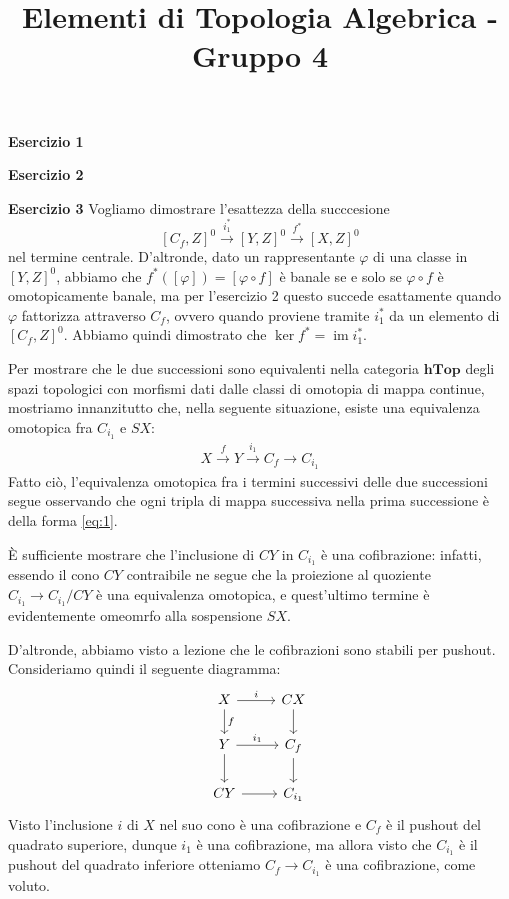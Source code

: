 \documentclass[a4paper]{article}
\title{Elementi di Topologia Algebrica - Gruppo 4\vspace{-1cm}}
\author{}
\newcommand{\im}{\operatorname{im}}
\theoremstyle{definition}
\theoremstyle{definition}
\theoremstyle{remark}
\theoremstyle{definition}
\begin{document}
\maketitle

\textbf{Esercizio 1}

\textbf{Esercizio 2}

\textbf{Esercizio 3}
Vogliamo dimostrare l'esattezza della succcesione
\[
    [C_f, Z]^0 \overset{i_1^*}{\to} [Y, Z]^0 \overset{f^*}{\to} [X, Z]^0
\]
nel termine centrale. D'altronde, dato un rappresentante $\varphi$ di una classe in $[Y, Z]^0$, abbiamo che $f^*([\varphi]) = [\varphi\circ f]$ è banale se e solo se $\varphi \circ f$ è omotopicamente banale, ma per l'esercizio 2 questo succede
esattamente quando $\varphi$ fattorizza attraverso $C_f$, ovvero quando proviene tramite $i_1^*$ da un elemento di $[C_f, Z]^0$. Abbiamo quindi dimostrato che $\ker f^* = \im i_1^*$.

Per mostrare che le due successioni sono equivalenti nella categoria $\mathbf{hTop}$ degli spazi topologici con morfismi dati dalle classi di omotopia di mappa continue, mostriamo innanzitutto che, nella seguente situazione, esiste una equivalenza omotopica fra $C_{i_1}$ e $SX$:
\begin{align}\label{eq:1}
    X\overset{f}{\to} Y\overset{i_1}{\to} C_f \to C_{i_1}
\end{align}
Fatto ciò, l'equivalenza omotopica fra i termini successivi delle due successioni segue osservando che ogni tripla di mappa successiva nella prima successione è della forma \eqref{eq:1}.

È sufficiente mostrare che l'inclusione di $CY$ in $C_{i_1}$ è una cofibrazione: infatti, essendo il cono $CY$ contraibile ne segue che la proiezione al quoziente $C_{i_1} \to C_{i_1}/CY$ è una equivalenza omotopica, e quest'ultimo termine è evidentemente omeomrfo alla sospensione $SX$.

D'altronde, abbiamo visto a lezione che le cofibrazioni sono stabili per pushout. Consideriamo quindi il seguente diagramma:
\[
    \begin{tikzcd}
        X \arrow[r,"i"] \arrow[d,"f"] & CX \arrow[d] \\
        Y \arrow[r,"i_1"] \arrow[d] & C_f \arrow[d] \\
        CY \arrow[r] & C_{i_1}
    \end{tikzcd}
\]
Visto l'inclusione $i$ di $X$ nel suo cono è una cofibrazione e $C_f$ è il pushout del quadrato superiore, dunque $i_1$ è una cofibrazione, ma allora visto che $C_{i_1}$ è il pushout del quadrato inferiore otteniamo $C_f \to C_{i_1}$ è una cofibrazione, come voluto.
\end{document}
